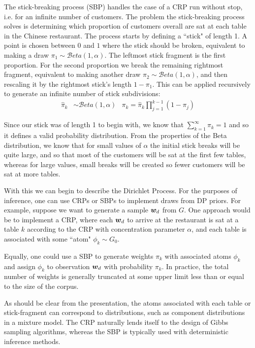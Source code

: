 The stick-breaking process (SBP) handles the case of a CRP run without stop, i.e. for an infinite number of customers. The problem the stick-breaking process solves is determining which proportion of customers overall are sat at each table in the Chinese restaurant. The process starts by defining a ``stick" of length 1. A point is chosen between $0$ and $1$ where the stick should be broken, equivalent to making a draw $\pi_1 \sim \mathcal{B}eta\left(1, \alpha\right)$. The leftmost stick fragment is the first proportion. For the second proportion we break the remaining rightmost fragment, equivalent to making another draw $\pi_2 \sim \mathcal{B}eta\left(1, \alpha\right)$, and then rescaling it by the rightmost stick's length $1-\pi_1$. This can be applied recursively to generate an infinite number of stick subdivisions:
\begin{align}
\hat{\pi}_k & \sim \mathcal{B}eta\left(1, \alpha\right) & \pi_k = \hat{\pi}_k \prod_{j=1}^{k-1} (1 - \pi_j)
\end{align}

Since our stick was of length 1 to begin with, we know that $\sum_{k=1}^{\infty} \pi_k = 1$ and so it defines a valid probability distribution. From the properties of the Beta distribution, we know that for small values of $\alpha$ the initial stick breaks will be quite large, and so that most of the customers will be sat at the first few tables, whereas for large values, small breaks will be created so fewer customers will be sat at more tables.

With this we can begin to describe the Dirichlet Process. For the purposes of inference, one can use CRPs or SBPs to implement draws from DP priors. For example, suppose we want to generate a sample ${ \bm w_d }$ from $G$. One approach would be to implement a CRP\cite{Neal2000}, where each ${ \bm w_d }$ to arrive at the restaurant is sat at a table $k$ according to the CRP with concentration parameter $\alpha$, and each table is associated with some ``atom" $\phi_k \sim G_0$.

Equally, one could use a SBP\cite{Sethuraman1994} to generate weights $\pi_k$ with associated atoms $\phi_k$ and assign $\phi_k$ to observation ${ \bm w_d }$ with probability $\pi_k$. In practice, the total number of weights is generally truncated at some upper limit less than or equal to the size of the corpus. 

As should be clear from the presentation, the atoms associated with each table or stick-fragment can correspond to distributions, such as component distributions in a mixture model. The CRP naturally lends itself to the design of Gibbs sampling algorithms, whereas the SBP is typically used with deterministic inference methods. 

